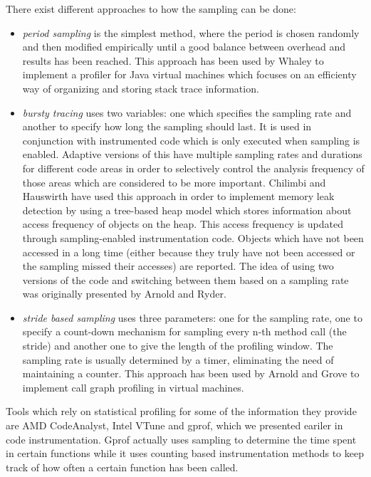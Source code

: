 There exist different approaches to how the sampling can be done:
\begin{itemize}
\item \textit{period sampling} is the simplest method, where the period is chosen randomly and then modified empirically until a good balance between overhead and results has been reached. This approach has been used by Whaley\cite{} to implement a profiler for Java virtual machines which focuses on an efficienty way of organizing and storing stack trace information.
\item \textit{bursty tracing} uses two variables: one which specifies the sampling rate and another to specify how long the sampling should last. It is used in conjunction with instrumented code which is only executed when sampling is enabled. Adaptive versions of this have multiple sampling rates and durations for different code areas in order to selectively control the analysis frequency of those areas which are considered to be more important. Chilimbi and Hauswirth\cite{Hauswirth04} have used this approach in order to implement memory leak detection by using a tree-based heap model which stores information about access frequency of objects on the heap. This access frequency is updated through sampling-enabled instrumentation code. Objects which have not been accessed in a long time (either because they truly have not been accessed or the sampling missed their accesses) are reported. The idea of using two versions of the code and switching between them based on a sampling rate was originally presented by Arnold and Ryder\cite{Arnold01}.
\item \textit{stride based sampling} uses three parameters: one for the sampling rate, one to specify a count-down mechanism for sampling every n-th method call (the stride) and another one to give the length of the profiling window. The sampling rate is usually determined by a timer, eliminating the need of maintaining a counter. This approach has been used by Arnold and Grove\cite{Arnold05} to implement call graph profiling in virtual machines.
\end{itemize}

Tools which rely on statistical profiling for some of the information they provide are AMD CodeAnalyst, Intel VTune and gprof, which we presented eariler in code instrumentation. Gprof actually uses sampling to determine the time spent in certain functions while it uses counting based instrumentation methods to keep track of how often a certain function has been called.

